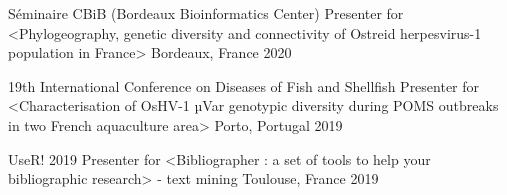 



\begin{cvhonors}

  \cvhonor
    {Séminaire CBiB (Bordeaux Bioinformatics Center)} %
    {Presenter for <Phylogeography, genetic diversity and connectivity of Ostreid herpesvirus-1 population in France>} %
    {Bordeaux, France} %
    {2020} %

  \cvhonor
    {19th International Conference on Diseases of Fish and Shellfish} %
    {Presenter for <Characterisation of OsHV-1 µVar genotypic diversity during POMS outbreaks in two French aquaculture area>} %
    {Porto, Portugal} %
    {2019} %

  \cvhonor
    {UseR! 2019} %
    {Presenter for <Bibliographer : a set of tools to help your bibliographic research> - text mining} %
    {Toulouse, France} %
    {2019} %

\end{cvhonors}

